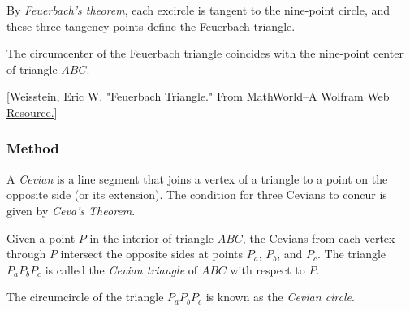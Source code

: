 By \emph{Feuerbach’s theorem}, each excircle is tangent to the nine-point circle, and these three tangency points define the Feuerbach triangle.

The circumcenter of the Feuerbach triangle coincides with the nine-point center of triangle $ABC$.

\begin{flushright}
  \small
[\href{https://mathworld.wolfram.com/FeuerbachTriangle.html}{Weisstein, Eric W. "Feuerbach Triangle." From MathWorld--A Wolfram Web Resource.}]
\end{flushright}

\vspace{1em}

\begin{tkzexample}[latex=.5\textwidth]
\end{tkzexample}

\subsubsection{Method } %
\label{ssub:method_triangle_cevian}

A \emph{Cevian} is a line segment that joins a vertex of a triangle to a point on the opposite side (or its extension). The condition for three Cevians to concur is given by \emph{Ceva's Theorem}.

Given a point $P$ in the interior of triangle $ABC$, the Cevians from each vertex through $P$ intersect the opposite sides at points $P_a$, $P_b$, and $P_c$. The triangle $P_aP_bP_c$ is called the \emph{Cevian triangle} of $ABC$ with respect to $P$.

The circumcircle of the triangle $P_aP_bP_c$ is known as the \emph{Cevian circle}.

